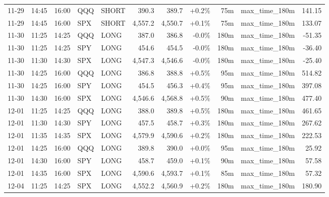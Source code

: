 \documentclass[11pt,a4paper,twoside]{article}
\begin{document}
\begin{center}
\begin{longtable}{>{\color{txtmain}}l l l l l r r r r >{\color{txtmain}}l r}
11-29 & 14:45 & 16:00 & QQQ & SHORT & 390.3 & 389.7 & \textcolor{wingreen}{+0.2\%} & 75m & max\_time\_180m & \textcolor{wingreen}{141.15} \\
11-29 & 14:45 & 16:00 & SPX & SHORT & 4,557.2 & 4,550.7 & \textcolor{wingreen}{+0.1\%} & 75m & max\_time\_180m & \textcolor{wingreen}{133.07} \\
11-30 & 11:25 & 14:25 & QQQ & LONG & 387.0 & 386.8 & \textcolor{lossred}{-0.0\%} & 180m & max\_time\_180m & \textcolor{lossred}{-51.35} \\
11-30 & 11:25 & 14:25 & SPY & LONG & 454.6 & 454.5 & \textcolor{lossred}{-0.0\%} & 180m & max\_time\_180m & \textcolor{lossred}{-36.40} \\
11-30 & 11:30 & 14:30 & SPX & LONG & 4,547.3 & 4,546.6 & \textcolor{lossred}{-0.0\%} & 180m & max\_time\_180m & \textcolor{lossred}{-25.40} \\
11-30 & 14:25 & 16:00 & QQQ & LONG & 386.8 & 388.8 & \textcolor{wingreen}{+0.5\%} & 95m & max\_time\_180m & \textcolor{wingreen}{514.82} \\
11-30 & 14:25 & 16:00 & SPY & LONG & 454.5 & 456.3 & \textcolor{wingreen}{+0.4\%} & 95m & max\_time\_180m & \textcolor{wingreen}{397.08} \\
11-30 & 14:30 & 16:00 & SPX & LONG & 4,546.6 & 4,568.8 & \textcolor{wingreen}{+0.5\%} & 90m & max\_time\_180m & \textcolor{wingreen}{477.40} \\
12-01 & 11:25 & 14:25 & QQQ & LONG & 388.0 & 389.8 & \textcolor{wingreen}{+0.5\%} & 180m & max\_time\_180m & \textcolor{wingreen}{461.65} \\
12-01 & 11:30 & 14:30 & SPY & LONG & 457.5 & 458.7 & \textcolor{wingreen}{+0.3\%} & 180m & max\_time\_180m & \textcolor{wingreen}{267.62} \\
12-01 & 11:35 & 14:35 & SPX & LONG & 4,579.9 & 4,590.6 & \textcolor{wingreen}{+0.2\%} & 180m & max\_time\_180m & \textcolor{wingreen}{222.53} \\
12-01 & 14:25 & 16:00 & QQQ & LONG & 389.8 & 390.0 & \textcolor{wingreen}{+0.0\%} & 95m & max\_time\_180m & \textcolor{wingreen}{25.92} \\
12-01 & 14:30 & 16:00 & SPY & LONG & 458.7 & 459.0 & \textcolor{wingreen}{+0.1\%} & 90m & max\_time\_180m & \textcolor{wingreen}{57.58} \\
12-01 & 14:35 & 16:00 & SPX & LONG & 4,590.6 & 4,593.7 & \textcolor{wingreen}{+0.1\%} & 85m & max\_time\_180m & \textcolor{wingreen}{57.32} \\
12-04 & 11:25 & 14:25 & SPX & LONG & 4,552.2 & 4,560.9 & \textcolor{wingreen}{+0.2\%} & 180m & max\_time\_180m & \textcolor{wingreen}{180.90} \\

\end{longtable}
\end{center}
\end{document}
